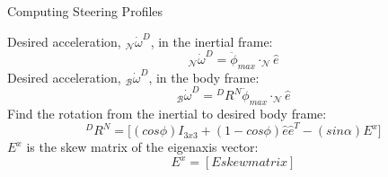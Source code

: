 \documentclass{beamer}
\begin{document}
%
\begin{frame}{Computing Steering Profiles}

\begin{block}{ }
	Desired acceleration, $_\mathcal{N}\dot{\omega}^{D}$, in the inertial frame: 
	\begin{equation}
	_\mathcal{N}\dot{\omega}^{D} = \ddot{\phi}_{max}\cdot _\mathcal{N}\hat{e}
	\end{equation}
	Desired acceleration, $_\mathcal{B}\dot{\omega}^{D}$, in the body frame: 
	\begin{equation}
	_\mathcal{B}\dot{\omega}^{D} = {}^DR^N \ddot{\phi}_{max} \cdot _\mathcal{N}\hat{e}
	\end{equation}
	Find the rotation from the inertial to desired body frame: 
	\begin{equation}
	{}^DR^N = \big[(cos\phi)I_{3x3} + (1 - cos\phi)\hat{e}\hat{e}^T - (sin\alpha)E^x \big]
	\end{equation}
	$E^x$ is the skew matrix of the eigenaxis vector: 
	\begin{equation}
	E^x = [ E skew matrix ]
	\end{equation}
	
\end{block}

\end{frame}
\end{document}
